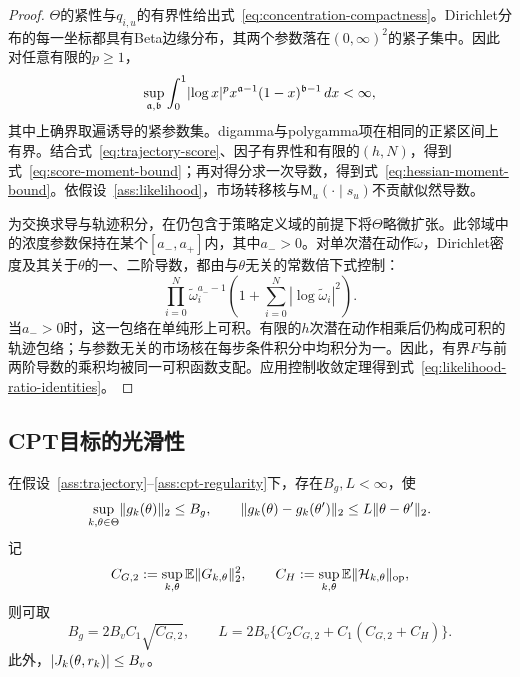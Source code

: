 \begin{proof}
$\Theta$的紧性与$q_{i,u}$的有界性给出式~\eqref{eq:concentration-compactness}。Dirichlet分布的每一坐标都具有Beta边缘分布，其两个参数落在$(0,\infty)^2$的紧子集中。因此对任意有限的$p\ge1$，
\[
 \sup_{\mathfrak a,\mathfrak b}\int_0^1
 \lvert\log x\rvert^p x^{\mathfrak a-1}(1-x)^{\mathfrak b-1}\,dx<\infty,
\]
其中上确界取遍诱导的紧参数集。digamma与polygamma项在相同的正紧区间上有界。结合式~\eqref{eq:trajectory-score}、因子有界性和有限的$(h,N)$，得到式~\eqref{eq:score-moment-bound}；再对得分求一次导数，得到式~\eqref{eq:hessian-moment-bound}。依假设~\ref{ass:likelihood}，市场转移核与$\mathsf M_u(\cdot\mid s_u)$不贡献似然导数。

为交换求导与轨迹积分，在仍包含于策略定义域的前提下将$\Theta$略微扩张。此邻域中的浓度参数保持在某个$[a_-,a_+]$内，其中$a_->0$。对单次潜在动作$\widetilde\omega$，Dirichlet密度及其关于$\theta$的一、二阶导数，都由与$\theta$无关的常数倍下式控制：
\[
 \prod_{i=0}^{N}\widetilde\omega_i^{a_- -1}
 \left(1+\sum_{i=0}^{N}|\log\widetilde\omega_i|^2\right).
\]
当$a_->0$时，这一包络在单纯形上可积。有限的$h$次潜在动作相乘后仍构成可积的轨迹包络；与参数无关的市场核在每步条件积分中均积分为一。因此，有界$F$与前两阶导数的乘积均被同一可积函数支配。应用控制收敛定理得到式~\eqref{eq:likelihood-ratio-identities}。
\end{proof}

\subsection{CPT目标的光滑性}

\begin{lemma}[统一梯度界与光滑界]\label{lem:cpt-smoothness}
在假设~\ref{ass:trajectory}--\ref{ass:cpt-regularity}下，存在$B_g,L<\infty$，使
\begin{equation}\label{eq:uniform-gradient-smoothness}
 \sup_{k,\theta\in\Theta}\lVert g_k(\theta)\rVert_2\le B_g,
 \qquad
 \lVert g_k(\theta)-g_k(\theta')\rVert_2\le L\lVert\theta-\theta'\rVert_2.
\end{equation}
记
\[
 C_{G,2}:=\sup_{k,\theta}\mathbb E\lVert G_{k,\theta}\rVert_2^2,
 \qquad
 C_H:=\sup_{k,\theta}\mathbb E\lVert\mathcal H_{k,\theta}\rVert_{\mathrm{op}},
\]
则可取
\begin{equation}\label{eq:smoothness-constant}
 B_g=2B_vC_1\sqrt{C_{G,2}},
 \qquad
 L=2B_v\{C_2C_{G,2}+C_1(C_{G,2}+C_H)\}.
\end{equation}
此外，$\lvert J_k(\theta,r_k)\rvert\le B_v$。
\end{lemma}

